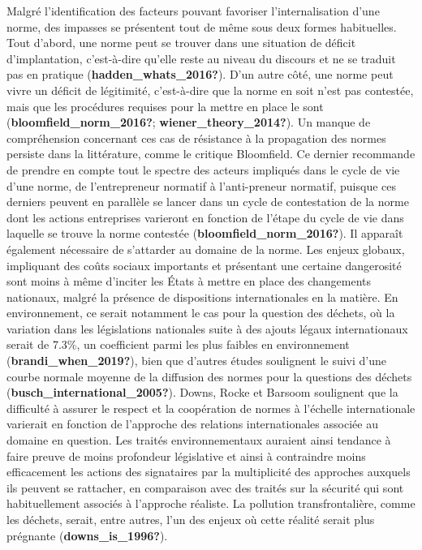 \documentclass[12pt]{ulaval}
\begin{document}
Malgré l'identification des facteurs pouvant favoriser l'internalisation d'une norme, des impasses se présentent tout de même sous deux formes habituelles. Tout d'abord, une norme peut se trouver dans une situation de déficit d'implantation, c'est-à-dire qu'elle reste au niveau du discours et ne se traduit pas en pratique (\textbf{hadden\_whats\_2016?}). D'un autre côté, une norme peut vivre un déficit de légitimité, c'est-à-dire que la norme en soit n'est pas contestée, mais que les procédures requises pour la mettre en place le sont (\textbf{bloomfield\_norm\_2016?}; \textbf{wiener\_theory\_2014?}). Un manque de compréhension concernant ces cas de résistance à la propagation des normes persiste dans la littérature, comme le critique Bloomfield. Ce dernier recommande de prendre en compte tout le spectre des acteurs impliqués dans le cycle de vie d'une norme, de l'entrepreneur normatif à l'anti-preneur normatif, puisque ces derniers peuvent en parallèle se lancer dans un cycle de contestation de la norme dont les actions entreprises varieront en fonction de l'étape du cycle de vie dans laquelle se trouve la norme contestée (\textbf{bloomfield\_norm\_2016?}). Il apparaît également nécessaire de s'attarder au domaine de la norme. Les enjeux globaux, impliquant des coûts sociaux importants et présentant une certaine dangerosité sont moins à même d'inciter les États à mettre en place des changements nationaux, malgré la présence de dispositions internationales en la matière. En environnement, ce serait notamment le cas pour la question des déchets, où la variation dans les législations nationales suite à des ajouts légaux internationaux serait de 7.3\%, un coefficient parmi les plus faibles en environnement (\textbf{brandi\_when\_2019?}), bien que d'autres études soulignent le suivi d'une courbe normale moyenne de la diffusion des normes pour la questions des déchets (\textbf{busch\_international\_2005?}). Downs, Rocke et Barsoom soulignent que la difficulté à assurer le respect et la coopération de normes à l'échelle internationale varierait en fonction de l'approche des relations internationales associée au domaine en question. Les traités environnementaux auraient ainsi tendance à faire preuve de moins profondeur législative et ainsi à contraindre moins efficacement les actions des signataires par la multiplicité des approches auxquels ils peuvent se rattacher, en comparaison avec des traités sur la sécurité qui sont habituellement associés à l'approche réaliste. La pollution transfrontalière, comme les déchets, serait, entre autres, l'un des enjeux où cette réalité serait plus prégnante (\textbf{downs\_is\_1996?}).
\end{document}
